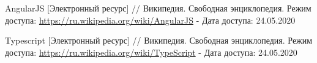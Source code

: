 \begin{thebibliography}{00}
    AngularJS
    [Электронный ресурс] //
    Википедия. Свободная энциклопедия.
    Режим доступа: \url{https://ru.wikipedia.org/wiki/AngularJS} -
    Дата доступа: 24.05.2020

    Typescript
    [Электронный ресурс] //
    Википедия. Свободная энциклопедия.
    Режим доступа: \url{https://ru.wikipedia.org/wiki/TypeScript} -
    Дата доступа: 24.05.2020

\end{thebibliography}
\endgroup

\clearpage